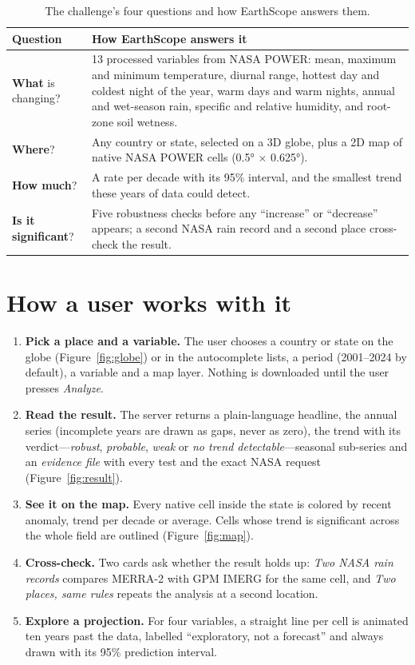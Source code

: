 \documentclass[12pt, oneside, openany]{report}
\begin{document}
\begin{table}[H]
\centering
\caption{The challenge's four questions and how EarthScope answers them.}
\label{tab:questions}
\begin{tabularx}{\linewidth}{@{}lX@{}}
\toprule
\textbf{Question} & \textbf{How EarthScope answers it} \\
\midrule
\textbf{What} is changing? & 13 processed variables from NASA POWER: mean, maximum and minimum temperature, diurnal range, hottest day and coldest night of the year, warm days and warm nights, annual and wet-season rain, specific and relative humidity, and root-zone soil wetness. \\
\textbf{Where}? & Any country or state, selected on a 3D globe, plus a 2D map of native NASA POWER cells (\ang{0.5} $\times$ \ang{0.625}). \\
\textbf{How much}? & A rate per decade with its 95\% interval, and the smallest trend these years of data could detect. \\
\textbf{Is it significant}? & Five robustness checks before any \enquote{increase} or \enquote{decrease} appears; a second NASA rain record and a second place cross-check the result. \\
\bottomrule
\end{tabularx}
\end{table}

\section{How a user works with it}

\begin{enumerate}[leftmargin=*]
    \item \textbf{Pick a place and a variable.} The user chooses a country or state on the globe (Figure~\ref{fig:globe}) or in the autocomplete lists, a period (2001--2024 by default), a variable and a map layer. Nothing is downloaded until the user presses \emph{Analyze}.
    \item \textbf{Read the result.} The server returns a plain-language headline, the annual series (incomplete years are drawn as gaps, never as zero), the trend with its verdict---\emph{robust}, \emph{probable}, \emph{weak} or \emph{no trend detectable}---seasonal sub-series and an \emph{evidence file} with every test and the exact NASA request (Figure~\ref{fig:result}).
    \item \textbf{See it on the map.} Every native cell inside the state is colored by recent anomaly, trend per decade or average. Cells whose trend is significant across the whole field are outlined (Figure~\ref{fig:map}).
    \item \textbf{Cross-check.} Two cards ask whether the result holds up: \emph{Two NASA rain records} compares MERRA-2 with GPM IMERG for the same cell, and \emph{Two places, same rules} repeats the analysis at a second location.
    \item \textbf{Explore a projection.} For four variables, a straight line per cell is animated ten years past the data, labelled \enquote{exploratory, not a forecast} and always drawn with its 95\% prediction interval.
\end{enumerate}
\end{document}
